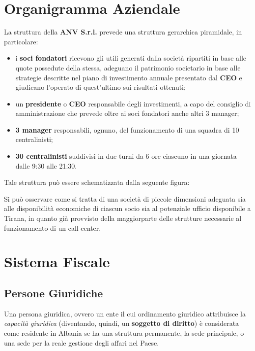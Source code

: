 \section[Organigramma Aziendale]{Organigramma Aziendale}
La struttura della\textbf{ \ac{ANV} S.r.l. }prevede una struttura gerarchica piramidale, in particolare:
\begin{itemize}

 	\item i \textbf{soci fondatori} ricevono gli utili generati dalla società ripartiti in base alle quote possedute della stessa, adeguano il patrimonio societario in base alle strategie descritte nel piano di investimento annuale presentato dal \textbf{\ac{CEO}} e giudicano l'operato di quest'ultimo sui risultati ottenuti; 
 	
	\item un \textbf{presidente} o \textbf{\ac{CEO}} responsabile degli investimenti, a capo del consiglio di amministrazione che prevede oltre ai soci fondatori anche altri 3 manager;
	
	\item \textbf{3 manager} responsabili, ognuno, del funzionamento di una squadra di 10 centralinisti;
	
	\item \textbf{30 centralinisti} suddivisi in due turni da 6 ore ciascuno in una giornata dalle 9:30 alle 21:30. 

\end{itemize}  

Tale struttura può essere schematizzata dalla seguente figura:
\newline


Si può osservare come si tratta di una società di piccole dimensioni adeguata sia alle disponibilità economiche di ciascun socio sia al potenziale ufficio disponibile a Tirana, in quanto già provvisto della maggiorparte delle strutture necessarie al funzionamento di un call center.

\section[Sistema Fiscale]{Sistema Fiscale}
  
\subsection[Persone Giuridiche]{Persone Giuridiche}
Una persona giuridica, ovvero un ente il cui ordinamento giuridico attribuisce la \textit{capacità giuridica} (diventando, quindi, un \textbf{soggetto di diritto}) è considerata come residente in Albania se ha una struttura permanente, la sede principale, o una sede per la reale gestione degli affari nel Paese.
